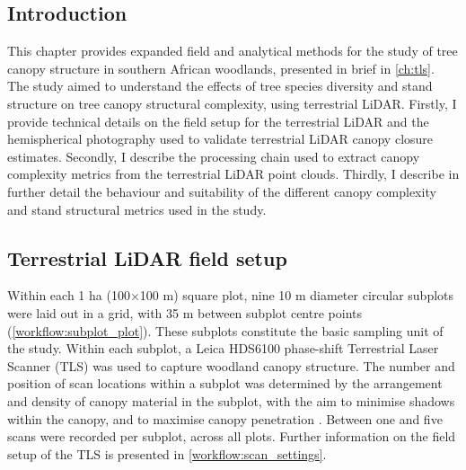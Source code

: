 \begin{refsection}





\chapter[\chaptertitle]{\chaptertitle}
\label{ch:workflow}

\section{Introduction}

This chapter provides expanded field and analytical methods for the study of tree canopy structure in southern African woodlands, presented in brief in \autoref{ch:tls}. The study aimed to understand the effects of tree species diversity and stand structure on tree canopy structural complexity, using terrestrial LiDAR. Firstly, I provide technical details on the field setup for the terrestrial LiDAR and the hemispherical photography used to validate terrestrial LiDAR canopy closure estimates. Secondly, I describe the processing chain used to extract canopy complexity metrics from the terrestrial LiDAR point clouds. Thirdly, I describe in further detail the behaviour and suitability of the different canopy complexity and stand structural metrics used in the study.

\section{Terrestrial LiDAR field setup}

Within each 1 ha (100$\times$100 m) square plot, nine 10 m diameter circular subplots were laid out in a grid, with 35 m between subplot centre points (\autoref{workflow:subplot_plot}). These subplots constitute the basic sampling unit of the study. Within each subplot, a Leica HDS6100 phase-shift Terrestrial Laser Scanner (TLS) was used to capture woodland canopy structure. The number and position of scan locations within a subplot was determined by the arrangement and density of canopy material in the subplot, with the aim to minimise shadows within the canopy, and to maximise canopy penetration \citep{Beland2021b}. Between one and five scans were recorded per subplot, across all plots. Further information on the field setup of the TLS is presented in \autoref{workflow:scan_settings}.


\end{refsection}
